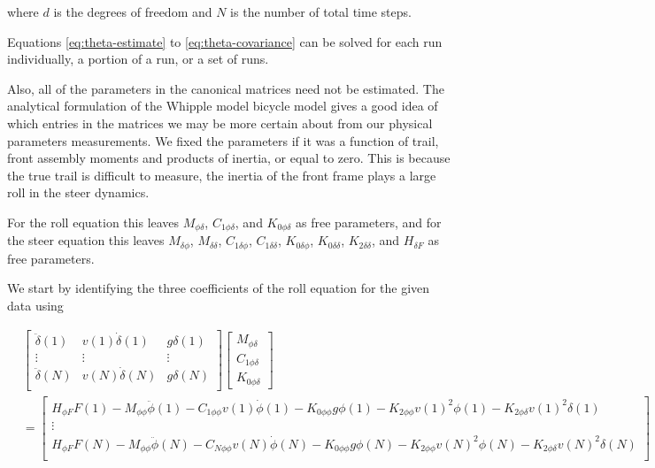 \documentclass[a4paper]{article}
\begin{document}
where $d$ is the degrees of freedom and $N$ is the number of total time steps.

Equations \ref{eq:theta-estimate} to \ref{eq:theta-covariance} can be
solved for each run individually, a portion of a run, or a set of runs.

Also, all of the parameters in the canonical matrices need not be estimated.
The analytical formulation of the Whipple model bicycle model
\cite{Meijaard2007} gives a good idea of which entries in the matrices we may
be more certain about from our physical parameters measurements. We fixed the
parameters if it was a function of trail, front assembly moments and products
of inertia, or equal to zero. This is because the true trail is difficult to
measure, the inertia of the front frame plays a large roll in the steer
dynamics.

For the roll equation this leaves $M_{\phi\delta}$, $C_{1\phi\delta}$,
and $K_{0\phi\delta}$ as free parameters, and for the steer equation
this leaves $M_{\delta\phi}$, $M_{\delta\delta}$, $C_{1\delta\phi}$,
$C_{1\delta\delta}$, $K_{0\delta\phi}$, $K_{0\delta\delta}$,
$K_{2\delta\delta}$, and $H_{\delta F}$ as free parameters.

We start by identifying the three coefficients of the roll equation for
the given data using

\begin{align}
  &\begin{bmatrix}
     \ddot{\delta}(1) &
     v(1) \dot{\delta}(1) &
     g \delta(1) \\
     \vdots & \vdots & \vdots\\
     \ddot{\delta}(N) &
     v(N) \dot{\delta}(N) &
     g \delta(N) \\
  \end{bmatrix}
  \begin{bmatrix}
    M_{\phi\delta} \\
    C_{1\phi\delta} \\
    K_{0\phi\delta}
  \end{bmatrix}\\
  &=
  \begin{bmatrix}
    H_{\phi F} F(1)
    - M_{\phi\phi} \ddot{\phi}(1)
    - C_{1\phi\phi} v(1) \dot{\phi}(1)
    - K_{0\phi\phi} g \phi(1)
    - K_{2\phi\phi} v(1)^2 \phi(1)
    - K_{2\phi\delta} v(1)^2 \delta(1) \\
  \vdots\\
    H_{\phi F} F(N)
    - M_{\phi\phi} \ddot{\phi}(N)
    - C_{N\phi\phi} v(N) \dot{\phi}(N)
    - K_{0\phi\phi} g \phi(N)
    - K_{2\phi\phi} v(N)^2 \phi(N)
    - K_{2\phi\delta} v(N)^2 \delta(N) \\
  \end{bmatrix} \nonumber
\end{align}
\end{document}
